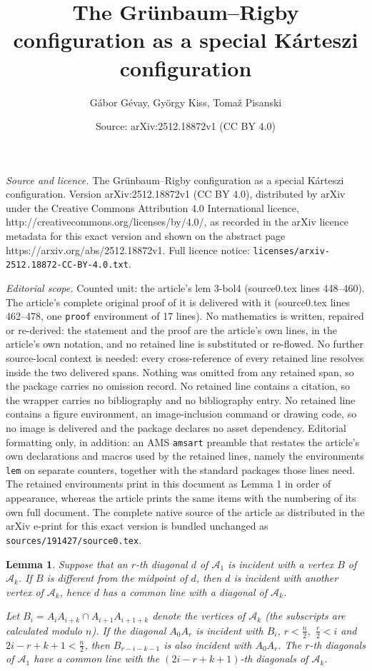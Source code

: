 \documentclass[10pt,a4paper]{amsart}
\title{The Grünbaum--Rigby configuration as a special Kárteszi configuration}
\author{G\'abor G\'evay, Gy\"orgy Kiss, Toma\v{z} Pisanski}
\date{Source: arXiv:2512.18872v1 (CC BY 4.0)}
\newtheorem{lem}{Lemma}
\begin{document}
\maketitle

\noindent\emph{Source and licence.} The Grünbaum--Rigby configuration as a special Kárteszi configuration. Version arXiv:2512.18872v1 (CC BY 4.0), distributed by arXiv under the Creative Commons Attribution 4.0 International licence, http://creativecommons.org/licenses/by/4.0/, as recorded in the arXiv licence metadata for this exact version and shown on the abstract page https://arxiv.org/abs/2512.18872v1. Full licence notice: \texttt{licenses/arxiv-2512.18872-CC-BY-4.0.txt}.\par\smallskip

\noindent\textit{Editorial scope.} Counted unit: the article's lem 3-bol4 (source0.tex lines 448--460). The article's complete original proof of it is delivered with it (source0.tex lines 462--478, one \texttt{proof} environment of 17 lines). No mathematics is written, repaired or re-derived: the statement and the proof are the article's own lines, in the article's own notation, and no retained line is substituted or re-flowed.  No further source-local context is needed: every cross-reference of every retained line resolves inside the two delivered spans.  Nothing was omitted from any retained span, so the package carries no omission record.  No retained line contains a citation, so the wrapper carries no bibliography and no bibliography entry.  No retained line contains a figure environment, an image-inclusion command or drawing code, so no image is delivered and the package declares no asset dependency.  Editorial formatting only, in addition: an AMS \texttt{amsart} preamble that restates the article's own declarations and macros used by the retained lines, namely the environments \texttt{lem} on separate counters, together with the standard packages those lines need.  The retained environments print in this document as Lemma 1 in order of appearance, whereas the article prints the same items with the numbering of its own full document.  The complete native source of the article as distributed in the arXiv e-print for this exact version is bundled unchanged as \texttt{sources/191427/source0.tex}.
\begin{lem}
\label{3-bol4}
Suppose that an $r$-th diagonal $d$ of $\mathcal{A}_1 $ is incident with a vertex $B$ of $\mathcal{A}_k$. 
If $B$ is different from the midpoint of $d$, then $d$ is incident with another vertex of $\mathcal{A}_k $, 
hence $d$ has a common line with a diagonal of $\mathcal{A}_k $.

Let $B_i=A_iA_{i+k}\cap A_{i+1}A_{i+1+k}$ denote the vertices of
$\mathcal{A}_k $ (the subscripts are calculated modulo $n$). 
If the diagonal $A_0A_{r}$ is incident with $B_i$, $r<\frac{n}{2},$ $\frac{r}{2}<i$ and 
$2i-r+k+1<\frac{n}{2}$, then $B_{r-i-k-1}$ is also incident with $A_0A_{r}$. 
The $r$-th diagonals of $\mathcal{A}_1 $
have a common line with the $(2i-r+k+1)$-th diagonals of $\mathcal{A}_k $. 
\end{lem}
\end{document}
